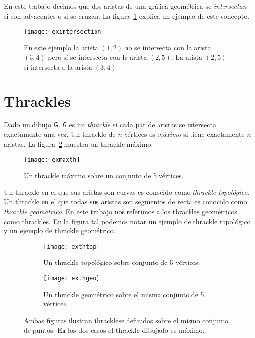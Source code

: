 En este trabajo decimos que dos aristas de una gráfica geométrica se \emph{intersectan}
si son adyacentes o si se cruzan. La figura~\ref{fig:exintersection} explica un ejemplo de este concepto.
\begin{figure}[htpb]
  \centering
  \texttt{[image: exintersection]}
  \caption{En este ejemplo la arista $(1,2)$ no se intersecta con la arista $(3,4)$
  pero sí se intersecta con la arista $(2,5)$. La arista $(2,5)$ sí intersecta a la arista
  $(3,4)$}
  \label{fig:exintersection}
\end{figure}

\section{Thrackles}
Dado un dibujo $\mathsf{G}$. $\mathsf{G}$ es un \emph{thrackle} si cada par de aristas
se intersecta exactamente una vez. Un thrackle de $n$ vértices
es \emph{máximo} si tiene exactamente $n$ aristas. La figura~\ref{fig:exmaxth} muestra un
thrackle máximo.

\begin{figure}[htpb]
  \centering
  \texttt{[image: exmaxth]}
  \caption{Un thrackle máximo sobre un conjunto de 5 vértices.}
  \label{fig:exmaxth}
\end{figure}

Un thrackle en el que sus aristas son curvas es conocido como \emph{thrackle topológico}.
Un thrackle en el que todas sus aristas son segmentos de recta es conocido como
\emph{thrackle geométrico}. En este trabajo nos referimos a los thrackles geométricos
como thrackles. En la figura tal podemos notar un ejemplo de thrackle topológico y
un ejemplo de thrackle geométrico.

\begin{figure}[htb]
  \centering
\begin{subfigure}[h]{.4\textwidth}
  \centering
  \texttt{[image: exthtop]}
  \caption{Un thrackle topológico sobre conjunto de 5 vértices.}
  \label{fig:exthtop}
\end{subfigure}\hfill%
\begin{subfigure}[h]{.4\textwidth}
  \centering
  \texttt{[image: exthgeo]}
  \caption{Un thrackle geométrico sobre el mismo conjunto de 5 vértices.}
  \label{fig:exthgeo}
\end{subfigure}
\caption{Ambas figuras ilustran thracklese definidos sobre el mismo conjunto de
puntos. En los dos casos el thrackle dibujado es máximo.}
\label{fig:exthgeotop}
\end{figure}

